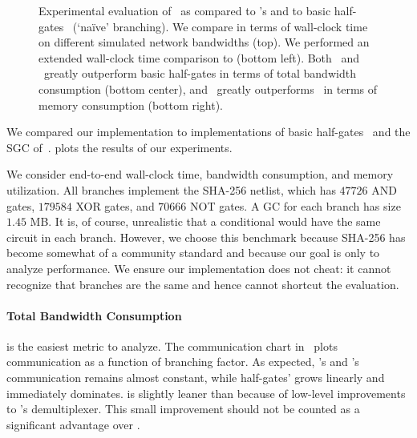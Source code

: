 \begin{figure}[t]
\begin{adjustwidth}{-0.13\textwidth}{-0.13\textwidth}
  \end{adjustwidth}
  \caption{%
    Experimental evaluation of \ourschemelong\ as compared to  \HK's
    \stack and to basic half-gates~\cite{EC:ZahRosEva15} (`na\"ive'
    branching).
    We compare in terms of wall-clock time on different simulated network
    bandwidths (top).
    We performed an extended wall-clock time comparison to \stack
    (bottom left).
    Both \ourschemelong\ and \stack\ greatly outperform basic
    half-gates in terms of total bandwidth consumption (bottom
    center), and \ourschemelong\ greatly outperforms \stack\ in terms
    of memory consumption (bottom right).
  }\label{fig:plots}
\end{figure}

We compared our implementation
to implementations of basic half-gates~\cite{EC:ZahRosEva15} and the
\stack SGC of~\HK.
 plots the results of our experiments.

We consider end-to-end wall-clock time, bandwidth consumption, and memory utilization.
All branches implement the SHA-256 netlist, which has $47726$ AND gates,
$179584$ XOR gates, and $70666$ NOT gates.
A GC for each branch has size $1.45$ MB.
It is, of course, unrealistic that a conditional would have the same
circuit in each branch. However, we choose this benchmark because
SHA-256 has become somewhat of a community standard and because our
goal is only to analyze performance.
%
We ensure our implementation does not cheat: it cannot recognize
that branches are the same and hence cannot shortcut the evaluation.

\vspace{-8pt}
\paragraph{Total Bandwidth Consumption}  is the easiest metric to analyze.
The communication chart in~ plots communication
as a function of branching factor.  As expected, \stack's and
\ourschemelong's communication remains almost constant, while half-gates'
grows linearly and immediately dominates.  \ourschemelong is slightly
leaner than \stack because of low-level improvements to
\ourschemelong's demultiplexer. This small improvement should not be counted
as a significant advantage over \stack.

\vspace{-8pt}
